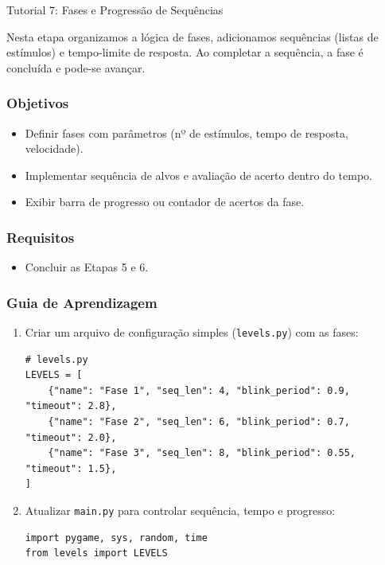 \documentclass[11pt,a4paper]{article}
\begin{document}
\newpage
\begin{boxTutorial}{Tutorial 7: Fases e Progressão de Sequências}
\label{sec: Etapa 7: Fases e Progressão de Sequências}

    Nesta etapa organizamos a lógica de fases, adicionamos sequências (listas de estímulos) e tempo-limite de resposta. Ao completar a sequência, a fase é concluída e pode-se avançar.
    
    \subsubsection*{Objetivos}
    \begin{itemize}
        \item Definir fases com parâmetros (nº de estímulos, tempo de resposta, velocidade).
        \item Implementar sequência de alvos e avaliação de acerto dentro do tempo.
        \item Exibir barra de progresso ou contador de acertos da fase.
    \end{itemize}
    
    \subsubsection*{Requisitos}
    \begin{itemize}
        \item Concluir as Etapas 5 e 6.
    \end{itemize}
    
    \subsubsection*{Guia de Aprendizagem}
    \begin{enumerate}
        \item Criar um arquivo de configuração simples (\texttt{levels.py}) com as fases:
    \begin{verbatim}
# levels.py
LEVELS = [
    {"name": "Fase 1", "seq_len": 4, "blink_period": 0.9, "timeout": 2.8},
    {"name": "Fase 2", "seq_len": 6, "blink_period": 0.7, "timeout": 2.0},
    {"name": "Fase 3", "seq_len": 8, "blink_period": 0.55, "timeout": 1.5},
]
    \end{verbatim}
    
        \item Atualizar \texttt{main.py} para controlar sequência, tempo e progresso:
    \begin{verbatim}
import pygame, sys, random, time
from levels import LEVELS


\end{verbatim}
\end{enumerate}
\end{boxTutorial}
\end{document}
